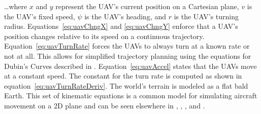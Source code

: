 \dots where $x$ and $y$ represent the UAV's current position on a Cartesian plane, $v$ is the UAV's fixed speed, $\psi$ is the UAV's heading, and $r$ is the UAV's turning radius.  Equations~\ref{eq:uavChngX} and \ref{eq:uavChngY} enforce that a UAV's position changes relative to its speed on a continuous trajectory.  Equation~\ref{eq:uavTurnRate} forces the UAVs to always turn at a known rate or not at all.  This allows for simplified trajectory planning using the equations for Dubin's Curves described in \parencite{dubins}.  Equation~\ref{eq:uavAccel} states that the UAVs move at a constant speed.  The constant for the turn rate is computed as shown in equation~\ref{eq:uavTurnRateDeriv}.  The world's terrain is modeled as a flat bald Earth.  This set of kinematic equations is a common model for simulating aircraft movement on a 2D plane and can be seen elsewhere in \parencite{beard}, \parencite{finke}, \parencite{mclainBeard}, and \parencite{coopPathBook}.

